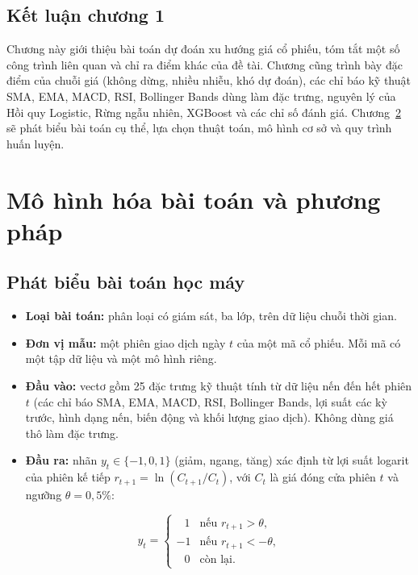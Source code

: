 \documentclass[12pt,a4paper,oneside]{report}
\begin{document}
\section{Kết luận chương 1}
Chương này giới thiệu bài toán dự đoán xu hướng giá cổ phiếu, tóm tắt một số
công trình liên quan và chỉ ra điểm khác của đề tài. Chương cũng trình bày đặc
điểm của chuỗi giá (không dừng, nhiều nhiễu, khó dự đoán), các chỉ báo kỹ thuật
SMA, EMA, MACD, RSI, Bollinger Bands dùng làm đặc trưng, nguyên lý của Hồi quy
Logistic, Rừng ngẫu nhiên, XGBoost và các chỉ số đánh giá. Chương~\ref{chap:phuongphap}
sẽ phát biểu bài toán cụ thể, lựa chọn thuật toán, mô hình cơ sở và quy trình
huấn luyện.

\chapter{Mô hình hóa bài toán và phương pháp \tenbaitoan}
\label{chap:phuongphap}

\section{Phát biểu bài toán học máy}
\begin{itemize}
  \item \textbf{Loại bài toán:} phân loại có giám sát, ba lớp, trên dữ liệu
        chuỗi thời gian.
  \item \textbf{Đơn vị mẫu:} một phiên giao dịch ngày $t$ của một mã cổ phiếu.
        Mỗi mã có một tập dữ liệu và một mô hình riêng.
  \item \textbf{Đầu vào:} vectơ gồm 25 đặc trưng kỹ thuật tính từ dữ liệu nến
        đến hết phiên $t$ (các chỉ báo SMA, EMA, MACD, RSI, Bollinger Bands, lợi
        suất các kỳ trước, hình dạng nến, biến động và khối lượng giao dịch).
        Không dùng giá thô làm đặc trưng.
  \item \textbf{Đầu ra:} nhãn $y_t \in \{-1, 0, 1\}$ (giảm, ngang, tăng) xác định
        từ lợi suất logarit của phiên kế tiếp
        $r_{t+1} = \ln(C_{t+1}/C_t)$, với $C_t$ là giá đóng cửa phiên $t$ và
        ngưỡng $\theta = 0{,}5\%$:
\end{itemize}
\begin{equation}
  y_t =
  \begin{cases}
    \;\;\,1 & \text{nếu } r_{t+1} > \theta, \\
    -1 & \text{nếu } r_{t+1} < -\theta, \\
    \;\;\,0 & \text{còn lại.}
  \end{cases}
  \label{eq:nhan}
\end{equation}
\end{document}
